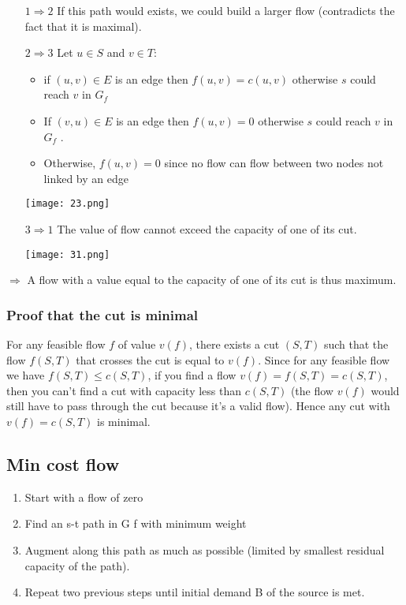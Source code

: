 \begin{itemize}
    \item[$1\Rightarrow2$] If this path would exists, we could build a
        larger flow (contradicts the fact that it is maximal).

    \item[$2\Rightarrow3$] Let $u \in S$ and $v\in T$:
        \begin{itemize}
            \item if $(u, v) \in E$ is an edge then $f(u, v) = c(u, v)$
                otherwise $s$ could reach $v$ in $G_f$ 
            \item If $(v, u) \in E$ is an edge then $f(u, v) = 0$
                otherwise $s$ could reach $v$ in $G_f$ .
            \item Otherwise, $f(u, v) = 0$ since no flow can flow between
                two nodes not linked by an edge
        \end{itemize}
        \begin{center}
    \texttt{[image: 23.png]}
    \end{center}

    \item[$3\Rightarrow1$] The value of flow cannot exceed the capacity of one of its
        cut.
        \begin{center}
    \texttt{[image: 31.png]}
    \end{center}
    \end{itemize}

$\Rightarrow$ A flow with a value equal to the capacity of one of its cut is thus
maximum.

\subsubsection{Proof that the cut is minimal}
For any feasible flow $f$ of value $v(f)$, there exists a cut $(S,T)$ such
that the flow $f(S,T)$ that crosses the cut is equal to $v(f)$. Since for
any feasible flow we have $f(S,T) \leqslant c(S,T)$, if you find a flow $v(f) =
f(S,T) = c(S,T)$, then you can't find a cut with capacity less than
$c(S,T)$ (the flow $v(f)$ would still have to pass through the cut because
it's a valid flow). Hence any cut with $v(f) = c(S,T)$ is minimal.

\subsection{Min cost flow}
\begin{enumerate}
    \item Start with a flow of zero
    \item  Find an s-t path in G f with minimum weight
    \item  Augment along this path as much as possible (limited by
        smallest
        residual capacity of the path).
    \item  Repeat two previous steps until initial demand B of the source
        is met.
\end{enumerate}

